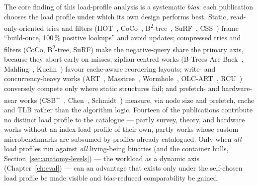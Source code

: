 The core finding of this load-profile analysis is a systematic \emph{bias}: each publication chooses
the load profile under which its own design performs best. Static, read-only-oriented
tries and filters (HOT~\cite{binna2018hot}, CoCo~\cite{boffa2024coco},
B\textsuperscript{2}-tree~\cite{schmeisser2022b2tree}, SuRF~\cite{zhang2018surf}, CSS~\cite{rao1999css})
frame \enquote{build-once, 100\,\% positive lookups} and avoid updates; compressed tries and
filters (CoCo, B\textsuperscript{2}-tree, SuRF) make the negative-query share the primary axis, because they
abort early on misses; zipfian-centred works (B-Trees Are Back~\cite{mueller2025btreesback},
Mahling~\cite{mahling2025hotpath}, Kuehn~\cite{kuehn2023bplustree}) favour cache-aware
reordering layouts; write- and concurrency-heavy works (ART~\cite{leis2013art},
Masstree~\cite{mao2012masstree}, Wormhole~\cite{wu2019wormhole}, OLC-ART~\cite{leis2016olc},
RCU~\cite{mckenney2001rcu}) conversely compete only where static structures fail; and prefetch-
and hardware-near works (CSB\textsuperscript{+}~\cite{rao2000csb}, Chen~\cite{chen2001prefetch},
Schmidt~\cite{schmidt2025hbm}) measure, via node size and prefetch, cache and TLB rather than the
algorithm logic. Fourteen of the publications contribute no distinct load profile to the catalogue ---
partly survey, theory, and hardware works without an index load profile of their own, partly works whose
custom microbenchmarks are subsumed by profiles already catalogued. Only when \emph{all} load profiles
run against \emph{all} living-being binaries (and the container hulls, Section~\ref{sec:anatomy-levels})
--- the workload as a dynamic axis
(Chapter~\ref{ch:eval}) --- can an advantage that exists only under the self-chosen load profile
be made visible and bias-reduced comparability be gained.

